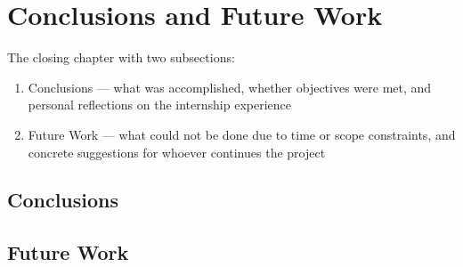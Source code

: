 \section{Conclusions and Future Work}

The closing chapter with two subsections:
\begin{enumerate}
    \item Conclusions — what was accomplished, whether objectives were met, and personal reflections on the internship experience
    \item Future Work — what could not be done due to time or scope constraints, and concrete suggestions for whoever continues the project
\end{enumerate}
    
\subsection{Conclusions}


\subsection{Future Work}

